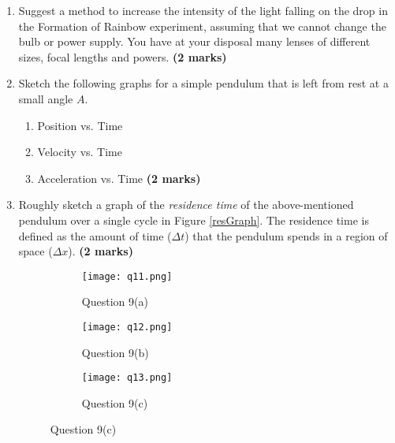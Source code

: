 \begin{enumerate}



\item Suggest a method to increase the intensity of the light falling on the drop in the Formation of Rainbow experiment, assuming that we cannot change the bulb or power supply. You have at your disposal many lenses of different sizes, focal lengths and powers. \hfill \textbf{(2 marks)}

\item Sketch the following graphs for a simple pendulum that is left from rest at a small angle $A$.

\begin{enumerate}
\item Position vs. Time
\item Velocity vs. Time 
\item Acceleration vs. Time \hfill \textbf{(2 marks)}
\end{enumerate} 

\item Roughly sketch a graph of the \textit{residence time} of the above-mentioned pendulum over a single cycle in Figure \ref{resGraph}. The residence time is defined as the amount of time ($\Delta t$) that the pendulum spends in a region of space ($\Delta x$). \hfill \textbf{(2 marks)}

\begin{figure}[!htb]
\centering
\begin{subfigure}[b]{0.5\textwidth}
\centering
\texttt{[image: q11.png]}
\caption{Question 9(a)}
\end{subfigure}%
\begin{subfigure}[b]{0.5\textwidth}
\centering
\texttt{[image: q12.png]}
\caption{Question 9(b)}
\end{subfigure}
\begin{subfigure}[b]{0.5\textwidth}
\centering
\texttt{[image: q13.png]}
\caption{Question 9(c)}
\end{subfigure}
\end{figure}




\end{enumerate}
